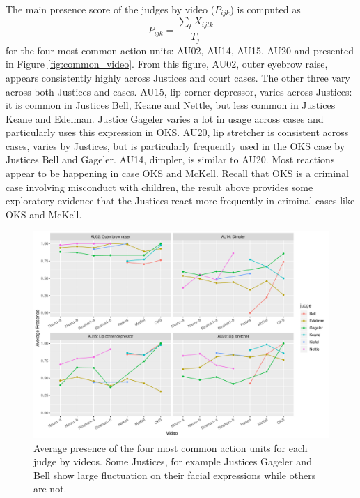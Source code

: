 \documentclass{monashthesis}
\begin{document}
The main presence score of the judges by video (\(P_{ijk}\)) is computed as \[P_{ijk} = \frac{\sum_{t}X_{ijtk}}{T_j}\] for the four most common action units: AU02, AU14, AU15, AU20 and presented in Figure \ref{fig:common_video}. From this figure, AU02, outer eyebrow raise, appears consistently highly across Justices and court cases. The other three vary across both Justices and cases. AU15, lip corner depressor, varies across Justices: it is common in Justices Bell, Keane and Nettle, but less common in Justices Keane and Edelman. Justice Gageler varies a lot in usage across cases and particularly uses this expression in OKS. AU20, lip stretcher is consistent across cases, varies by Justices, but is particularly frequently used in the OKS case by Justices Bell and Gageler. AU14, dimpler, is similar to AU20. Most reactions appear to be happening in case OKS and McKell. Recall that OKS is a criminal case involving misconduct with children, the result above provides some exploratory evidence that the Justices react more frequently in criminal cases like OKS and McKell.

\begin{figure}

{\centering \includegraphics[width=1\linewidth]{figures/au-video-1} 

}

\caption{Average presence of the four most common action units for each judge by videos. Some Justices, for example Justices Gageler and Bell show large fluctuation on their facial expressions while others are not. \label{fig:common_video}}\label{fig:au-video}
\end{figure}
\end{document}
